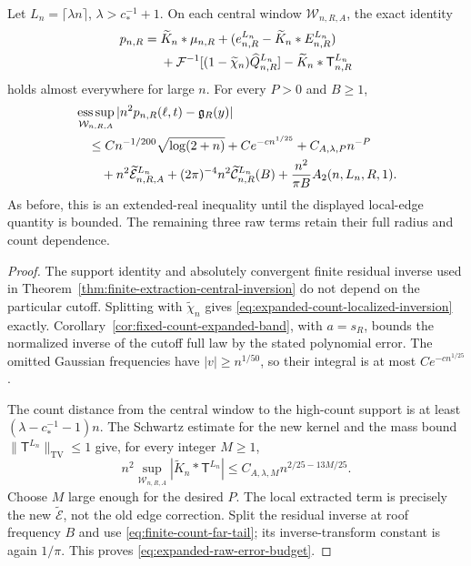 \begin{theorem}
\label{thm:expanded-count-localized-inversion}
Let $L_n=\lceil\lambda n\rceil$, $\lambda>c_*^{-1}+1$.
On each central window $\mathcal W_{n,R,A}$, the exact identity
\begin{align}
 p_{n,R}={}&\widetilde K_n*\mu_{n,R}
 +(e^{L_n}_{n,R}-\widetilde K_n*E^{L_n}_{n,R})\notag\\
 &+\mathcal F^{-1}[(1-\widetilde\chi_n)\widehat Q^{L_n}_{n,R}]
                     -\widetilde K_n*\mathsf T^{L_n}_{n,R}
 \label{eq:expanded-count-localized-inversion}
\end{align}
holds almost everywhere for large $n$. For every $P>0$ and $B\ge1$,
\begin{align}
 &\mathop{\rm ess\,sup}_{\mathcal W_{n,R,A}}
          |n^2p_{n,R}(\ell,t)-\mathfrak g_R(y)|\notag\\
 &\quad\le Cn^{-1/200}\sqrt{\log(2+n)}+Ce^{-c n^{1/25}}
                       +C_{A,\lambda,P}n^{-P}\notag\\
 &\qquad+n^2\widetilde{\mathcal E}_{n,R,A}^{L_n}
       +(2\pi)^{-4}n^2\widetilde{\mathcal C}_{n,R}^{L_n}(B)
       +\frac{n^2}{\pi B}A_2(n,L_n,R,1).
 \label{eq:expanded-raw-error-budget}
\end{align}
As before, this is an extended-real inequality until the displayed
local-edge quantity is bounded. The remaining three raw terms retain
their full radius and count dependence.
\end{theorem}
\begin{proof}
The support identity and absolutely convergent finite residual inverse
used in Theorem~\ref{thm:finite-extraction-central-inversion} do not
depend on the particular cutoff. Splitting with $\widetilde\chi_n$
gives \eqref{eq:expanded-count-localized-inversion} exactly.
Corollary~\ref{cor:fixed-count-expanded-band}, with $a=s_R$, bounds
the normalized inverse of the cutoff full law by the stated polynomial
error. The omitted Gaussian frequencies have $|v|\ge n^{1/50}$,
so their integral is at most $Ce^{-c n^{1/25}}$.

The count distance from the central window to the high-count support
is at least $(\lambda-c_*^{-1}-1)n$. The Schwartz estimate for the
new kernel and the mass bound $\|\mathsf T^{L_n}\|_{\mathrm{TV}}\le1$
give, for every integer $M\ge1$,
\[
 n^2\sup_{\mathcal W_{n,R,A}}|\widetilde K_n*\mathsf T^{L_n}|
                \le C_{A,\lambda,M}n^{2/25-13M/25}.
\]
Choose $M$ large enough for the desired $P$. The local extracted term
is precisely the new $\widetilde{\mathcal E}$, not the old edge
correction. Split the residual inverse at roof frequency $B$ and use
\eqref{eq:finite-count-far-tail}; its inverse-transform constant is
again $1/\pi$. This proves \eqref{eq:expanded-raw-error-budget}.
\end{proof}

